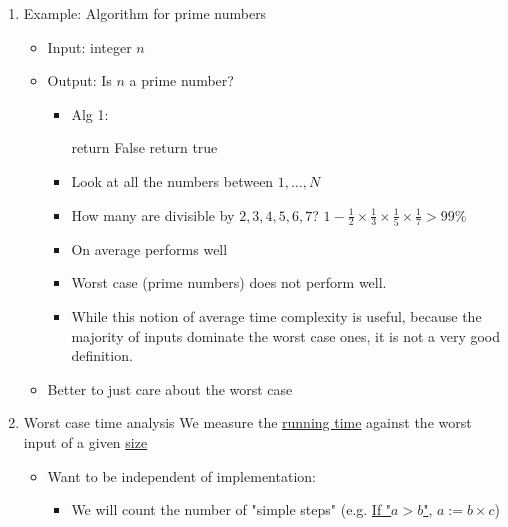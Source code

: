 \documentclass[11pt]{article}
\begin{document}
\begin{enumerate}
\begin{itemize}
\end{itemize}
\item Example: Algorithm for prime numbers
\label{sec:org64aec7b}
\begin{itemize}
\item Input: integer \(n\)
\item Output: Is \(n\) a prime number?
\begin{itemize}
\item Alg 1:
\begin{algorithmic}
		    return False
		   \EndIf
	\EndFor
	\State return true
\end{algorithmic}
\item Look at all the numbers between \(1,\ldots, N\)
\item How many are divisible by \({2,3,4,5,6,7}\)? \(1-\frac{1}{2}\times \frac{1}{3}\times \frac{1}{5} \times \frac{1}{7}>99\%\)
\item On average performs well
\item Worst case (prime numbers) does not perform well.
\item While this notion of average time complexity is useful, because the majority of inputs dominate the worst case ones, it is not a very good definition.
\end{itemize}
\item Better to just care about the worst case
\end{itemize}
\item Worst case time analysis
\label{sec:org1ff3385}
We measure the \uline{running time} against the worst input of a given \uline{size}
\begin{itemize}
\item Want to be independent of implementation:
\begin{itemize}
\item We will count the number of "simple steps" (e.g. \uline{If "\(a>b\)"}, \(a:=b \times c\))
\end{itemize}
\end{itemize}
\end{enumerate}
\end{document}
